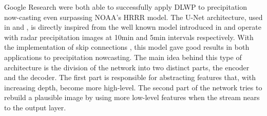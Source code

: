 Google Research \citet{Agrawal2019MachineImages,Snderby2020MetNet:Forecasting} were both able to successfully apply DLWP to precipitation now-casting even surpassing NOAA's HRRR model. The U-Net architecture, used in \citet{Agrawal2019MachineImages} and \citet{Ayzel2020RainNetNowcasting}, is directly inspired from the well known model introduced in \citet{Ronneberger2015U-Net:Segmentation} and operate with radar precipitation images at 10min and 5min intervals respectively. With the implementation of skip connections \citep{He2016DeepRecognition,He2016IdentityNetworks}, this model gave good results in both applications to precipitation nowcasting. The main idea behind this type of architecture is the division of the network into two distinct parts, the encoder and the decoder. The first part is responsible for abstracting features that, with increasing depth, become more high-level. The second part of the network tries to rebuild a plausible image by using more low-level features when the stream nears to the output layer.



